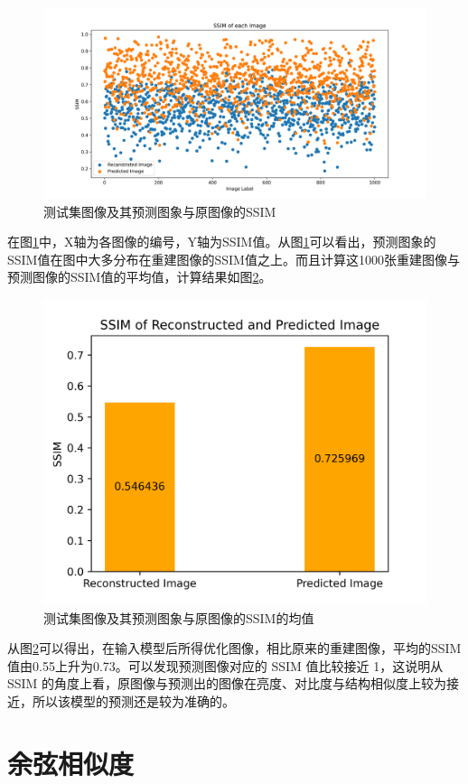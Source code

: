 \begin{figure}[h]
	\centering
	\includegraphics[width=0.9\columnwidth]{image/chap06/img605.png}
	\caption{测试集图像及其预测图象与原图像的SSIM}
	\label{fig605}
\end{figure}

在图\ref{fig605}中，X轴为各图像的编号，Y轴为SSIM值。从图\ref{fig605}可以看出，预测图象的SSIM值在图中大多分布在重建图像的SSIM值之上。而且计算这1000张重建图像与预测图像的SSIM值的平均值，计算结果如图\ref{fig606}。

\begin{figure}[h]
	\centering
	\includegraphics[width=0.75\columnwidth]{image/chap06/img606.png}
	\caption{测试集图像及其预测图象与原图像的SSIM的均值}
	\label{fig606}
\end{figure}

从图\ref{fig606}可以得出，在输入模型后所得优化图像，相比原来的重建图像，平均的SSIM值由0.55上升为0.73。可以发现预测图像对应的 SSIM 值比较接近 1，这说明从 SSIM 的角度上看，原图像与预测出的图像在亮度、对比度与结构相似度上较为接近，所以该模型的预测还是较为准确的。

\section{余弦相似度}
